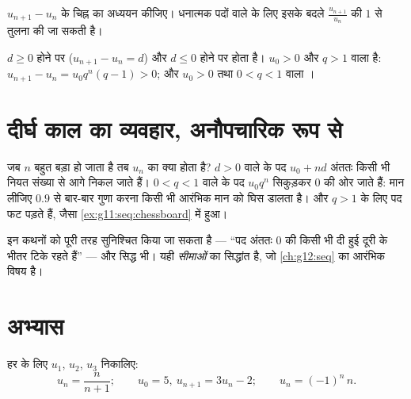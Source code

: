 \begin{method}\label{met:g11:seq:monotonicity}
$u_{n+1} - u_n$ के चिह्न का अध्ययन कीजिए। धनात्मक पदों वाले  के लिए इसके बदले
$\frac{u_{n+1}}{u_n}$ की $1$ से तुलना की जा सकती है।
\end{method}

\begin{example}
 $d \geq 0$ होने पर  ($u_{n+1} - u_n = d$) और $d \leq 0$ होने पर  होता
है। $u_0 > 0$ और $q > 1$ वाला   है: $u_{n+1} - u_n = u_0 q^n (q - 1) > 0$; और $u_0 > 0$ तथा
$0 < q < 1$ वाला ।
\end{example}

\section{दीर्घ काल का व्यवहार, अनौपचारिक रूप से}

जब $n$ बहुत बड़ा हो जाता है तब $u_n$ का क्या होता है? $d > 0$ वाले  के पद $u_0 + nd$ अंततः किसी भी नियत संख्या से आगे निकल जाते हैं। $0 < q < 1$
वाले  के पद $u_0 q^n$ सिकुड़कर $0$ की ओर जाते हैं: मान लीजिए
$0.9$ से बार-बार गुणा करना किसी भी आरंभिक मान को घिस डालता है। और $q > 1$ के
लिए पद फट पड़ते हैं, जैसा \cref{ex:g11:seq:chessboard} में हुआ।

\begin{remark}
इन कथनों को पूरी तरह सुनिश्चित किया जा सकता है --- ``पद अंततः $0$ की किसी
भी दी हुई दूरी के भीतर टिके रहते हैं'' --- और सिद्ध भी। यही \emph{सीमाओं}
का सिद्धांत है, जो \cref{ch:g12:seq} का आरंभिक विषय है।
\end{remark}

\section{अभ्यास}

\begin{exercise}[$\star$]\label{exo:g11:seq:1}
हर  के लिए $u_1$, $u_2$, $u_3$ निकालिए:
\[
u_n = \frac{n}{n+1}; \qquad
u_0 = 5,\ u_{n+1} = 3u_n - 2; \qquad
u_n = (-1)^n\,n .
\]
\end{exercise}

